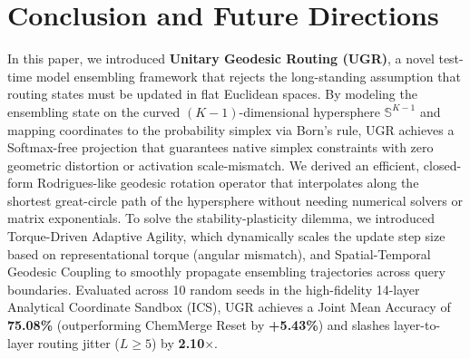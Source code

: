 \section{Conclusion and Future Directions}
\label{sec:conclusion}

In this paper, we introduced \textbf{Unitary Geodesic Routing (UGR)}, a novel test-time model ensembling framework that rejects the long-standing assumption that routing states must be updated in flat Euclidean spaces. By modeling the ensembling state on the curved $(K-1)$-dimensional hypersphere $\mathbb{S}^{K-1}$ and mapping coordinates to the probability simplex via Born's rule, UGR achieves a Softmax-free projection that guarantees native simplex constraints with zero geometric distortion or activation scale-mismatch. We derived an efficient, closed-form Rodrigues-like geodesic rotation operator that interpolates along the shortest great-circle path of the hypersphere without needing numerical solvers or matrix exponentials. To solve the stability-plasticity dilemma, we introduced Torque-Driven Adaptive Agility, which dynamically scales the update step size based on representational torque (angular mismatch), and Spatial-Temporal Geodesic Coupling to smoothly propagate ensembling trajectories across query boundaries. Evaluated across 10 random seeds in the high-fidelity 14-layer Analytical Coordinate Sandbox (ICS), UGR achieves a Joint Mean Accuracy of \textbf{75.08\%} (outperforming ChemMerge Reset by \textbf{+5.43\%}) and slashes layer-to-layer routing jitter ($L \ge 5$) by \textbf{2.10$\times$}.

